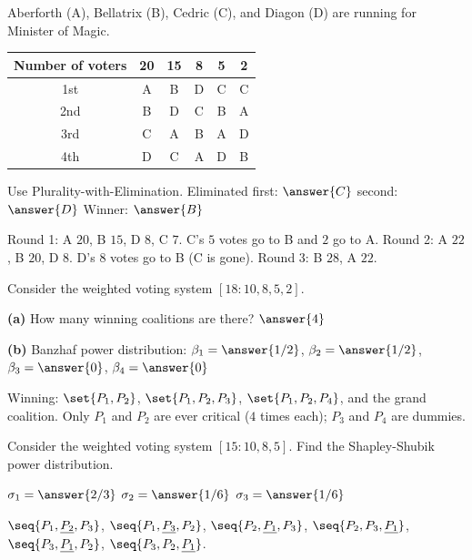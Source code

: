 \documentclass[12pt]{ximera}
\begin{document}
\begin{problem}
Aberforth (A), Bellatrix (B), Cedric (C), and Diagon (D) are running for Minister of
Magic.
\begin{center}
\begin{tabular}{c|ccccc}
Number of voters & 20 & 15 & 8 & 5 & 2\\\hline
1st & A & B & D & C & C\\
2nd & B & D & C & B & A\\
3rd & C & A & B & A & D\\
4th & D & C & A & D & B
\end{tabular}
\end{center}
Use Plurality-with-Elimination. Eliminated first: $\answer{C}$ \quad second:
$\answer{D}$ \qquad Winner: $\answer{B}$

\begin{feedback}
Round 1: A $20$, B $15$, D $8$, C $7$. C's $5$ votes go to B and $2$ go to A. Round 2:
A $22$, B $20$, D $8$. D's $8$ votes go to B (C is gone). Round 3: B $28$, A $22$.
\end{feedback}
\end{problem}

\begin{problem}
Consider the weighted voting system $[18:10,8,5,2]$.

\begin{prompt}
\textbf{(a)} How many winning coalitions are there? $\answer{4}$
\end{prompt}

\begin{prompt}
\textbf{(b)} Banzhaf power distribution: $\beta_1=\answer{1/2}$, $\beta_2=\answer{1/2}$,
$\beta_3=\answer{0}$, $\beta_4=\answer{0}$
\begin{feedback}
Winning: $\set{P_1,P_2}$, $\set{P_1,P_2,P_3}$, $\set{P_1,P_2,P_4}$, and the grand
coalition. Only $P_1$ and $P_2$ are ever critical ($4$ times each); $P_3$ and $P_4$ are
dummies.
\end{feedback}
\end{prompt}
\end{problem}

\begin{problem}
Consider the weighted voting system $[15:10,8,5]$. Find the Shapley-Shubik power
distribution.

$\sigma_1=\answer{2/3}$ \quad $\sigma_2=\answer{1/6}$ \quad $\sigma_3=\answer{1/6}$

\begin{feedback}
$\seq{P_1,\underline{P_2},P_3}$, $\seq{P_1,\underline{P_3},P_2}$,
$\seq{P_2,\underline{P_1},P_3}$, $\seq{P_2,P_3,\underline{P_1}}$,
$\seq{P_3,\underline{P_1},P_2}$, $\seq{P_3,P_2,\underline{P_1}}$.
\end{feedback}
\end{problem}
\end{document}
